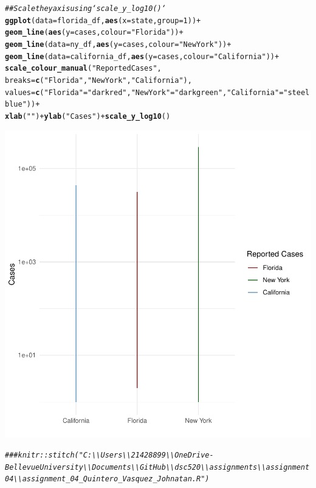\documentclass{article}\usepackage[]{graphicx}\usepackage[]{xcolor}
\makeatletter
\newcommand{\hlnum}[1]{\textcolor[rgb]{0.686,0.059,0.569}{#1}}%
\newcommand{\hlstr}[1]{\textcolor[rgb]{0.192,0.494,0.8}{#1}}%
\newcommand{\hlcom}[1]{\textcolor[rgb]{0.678,0.584,0.686}{\textit{#1}}}%
\newcommand{\hlopt}[1]{\textcolor[rgb]{0,0,0}{#1}}%
\newcommand{\hlstd}[1]{\textcolor[rgb]{0.345,0.345,0.345}{#1}}%
\newcommand{\hlkwc}[1]{\textcolor[rgb]{0.333,0.667,0.333}{#1}}%
\newcommand{\hlkwd}[1]{\textcolor[rgb]{0.737,0.353,0.396}{\textbf{#1}}}%
\newenvironment{kframe}{%
 \def\at@end@of@kframe{}%
 \ifinner\ifhmode%
  \def\at@end@of@kframe{\end{minipage}}%
  \begin{minipage}{\columnwidth}%
 \fi\fi%
 \def\FrameCommand##1{\hskip\@totalleftmargin \hskip-\fboxsep
 \colorbox{shadecolor}{##1}\hskip-\fboxsep
     \hskip-\linewidth \hskip-\@totalleftmargin \hskip\columnwidth}%
 \MakeFramed {\advance\hsize-\width
   \@totalleftmargin\z@ \linewidth\hsize
   \@setminipage}}%
 {\par\unskip\endMakeFramed%
 \at@end@of@kframe}
\newenvironment{knitrout}{}{} %
\makeatother
\begin{document}
\begin{knitrout}
\begin{kframe}\begin{alltt}
\hlcom{## Scale the y axis using `scale_y_log10()`}
\hlkwd{ggplot}\hlstd{(}\hlkwc{data}\hlstd{=florida_df,} \hlkwd{aes}\hlstd{(}\hlkwc{x}\hlstd{=state,} \hlkwc{group}\hlstd{=}\hlnum{1}\hlstd{))} \hlopt{+}
  \hlkwd{geom_line}\hlstd{(}\hlkwd{aes}\hlstd{(}\hlkwc{y} \hlstd{= cases,} \hlkwc{colour} \hlstd{=} \hlstr{"Florida"}\hlstd{))} \hlopt{+}
  \hlkwd{geom_line}\hlstd{(}\hlkwc{data}\hlstd{=ny_df,} \hlkwd{aes}\hlstd{(}\hlkwc{y} \hlstd{= cases,} \hlkwc{colour} \hlstd{=} \hlstr{"New York"}\hlstd{))} \hlopt{+}
  \hlkwd{geom_line}\hlstd{(}\hlkwc{data}\hlstd{=california_df,} \hlkwd{aes}\hlstd{(}\hlkwc{y} \hlstd{= cases,} \hlkwc{colour} \hlstd{=} \hlstr{"California"}\hlstd{))} \hlopt{+}
  \hlkwd{scale_colour_manual}\hlstd{(}\hlstr{"Reported Cases"}\hlstd{,}
                      \hlkwc{breaks} \hlstd{=} \hlkwd{c}\hlstd{(}\hlstr{"Florida"}\hlstd{,} \hlstr{"New York"}\hlstd{,} \hlstr{"California"}\hlstd{),}
                      \hlkwc{values} \hlstd{=} \hlkwd{c}\hlstd{(}\hlstr{"Florida"} \hlstd{=} \hlstr{"darkred"}\hlstd{,} \hlstr{"New York"} \hlstd{=} \hlstr{"darkgreen"}\hlstd{,} \hlstr{"California"} \hlstd{=} \hlstr{"steelblue"}\hlstd{))} \hlopt{+}
  \hlkwd{xlab}\hlstd{(}\hlstr{" "}\hlstd{)} \hlopt{+} \hlkwd{ylab}\hlstd{(}\hlstr{"Cases"}\hlstd{)} \hlopt{+} \hlkwd{scale_y_log10}\hlstd{()}
\end{alltt}
\end{kframe}

{\centering \includegraphics[width=.6\linewidth]{figure/assignment-04-Quintero-Vasquez-Johnatan-Rnwauto-report-10} 

}


\begin{kframe}\begin{alltt}
\hlcom{### knitr::stitch("C:\textbackslash{}\textbackslash{}Users\textbackslash{}\textbackslash{}21428899\textbackslash{}\textbackslash{}OneDrive-Bellevue University\textbackslash{}\textbackslash{}Documents\textbackslash{}\textbackslash{}GitHub\textbackslash{}\textbackslash{}dsc520\textbackslash{}\textbackslash{}assignments\textbackslash{}\textbackslash{}assignment04\textbackslash{}\textbackslash{}assignment_04_Quintero_Vasquez_Johnatan.R")}
\end{alltt}
\end{kframe}
\end{knitrout}
\end{document}
